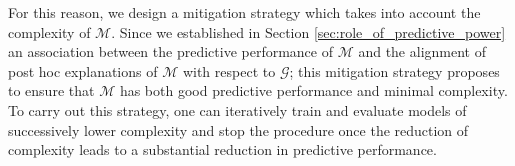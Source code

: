\documentclass[12pt]{article}  %
\newcommand{\tw}[1]{\textcolor{red}{Tong: #1}}
\begin{document}
            
            For this reason, we design a mitigation strategy which takes into account  the complexity of $\mathcal{M}$. Since we established in Section \ref{sec:role_of_predictive_power} an association between the predictive performance of $\mathcal{M}$ and the alignment of post hoc explanations of $\mathcal{M}$ with respect to $\mathcal{G}$; this mitigation strategy proposes to ensure that $\mathcal{M}$ has both good predictive performance and minimal complexity. %
            To carry out this strategy, one can iteratively train and evaluate models of successively lower complexity and stop the procedure once the reduction of complexity leads to a substantial reduction in predictive performance. 
\end{document}
